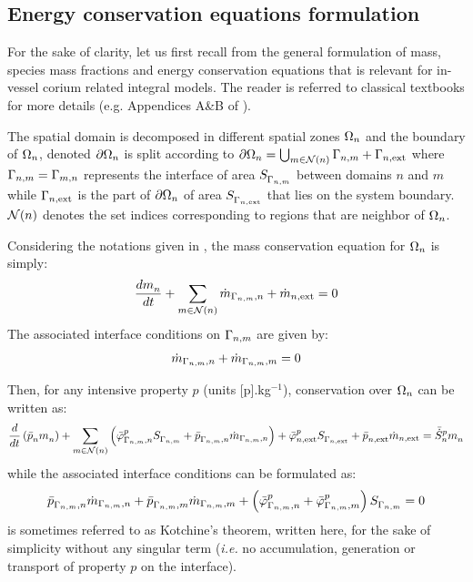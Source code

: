 
\subsection{Energy conservation equations formulation} \label{sect:cons_eq}

For the sake of clarity, let us first recall from the general formulation of mass, species mass fractions and energy conservation equations that is relevant for in-vessel corium related integral models. The reader is referred to classical textbooks for more details (e.g. Appendices A\&B of \cite{Kaviany2011}).

The spatial domain is decomposed in different spatial zones $\Omega_{n}$ and the boundary of $\Omega_{n}$, denoted $\partial \Omega_{n}$ is split according to $\partial \Omega_{n} = \bigcup_{m \in {\mathcal N}(n)} \Gamma_{n,m} + \Gamma_{n,\textrm{ext}}$ where $\Gamma_{n,m}=\Gamma_{m,n}$ represents the interface of area $\area{\interface{n,m}}$ between domains $n$ and $m$ while $\Gamma_{n,\textrm{ext}}$ is the part of $\partial \Omega_{n}$ of area $\area{\interface{n,\textrm{ext}}}$ that lies on the system boundary. ${\mathcal N}(n)$ denotes the set indices corresponding to regions that are neighbor of $\Omega_{n}$.

Considering the notations given in , the mass conservation equation for $\Omega_{n}$  is simply: 
\begin{equation} 
 \frac{d\mass{n}}{dt}  + \sum_{m \in  \Mc{N}(n)} \dot{m}_{\interface{n,m},n} + \dot{m}_{n, \textrm{ext}} = 0 \label{eq:mce_m}
\end{equation}
The associated interface conditions on $\Gamma_{n,m}$ are given by:
\begin{equation}
 \dot{m}_{\Gamma_{n,m},n}+\dot{m}_{\Gamma_{n,m},m} = 0 \label{eq:ie_m}
\end{equation}

Then, for any intensive property $p$ (units [p].kg$^{-1}$), conservation over $\Omega_{n}$ can be written as:
 \begin{equation}
  \frac{d}{dt} \left( \avProperty{n} \mass{n} \right) + \sum_{m \in  \Mc{N}(n)} \left(\avFlux[p]{\interface{n,m},n} \area{\interface{n,m}} + \avProperty{\interface{n,m},n} \dot{m}_{\interface{n,m},n}\right) + \avFlux[p]{n, \textrm{ext}} \area{\interface{n,\textrm{ext}}} + \avProperty{n, \textrm{ext}} \dot{m}_{n, \textrm{ext}} = \avMassSource[p]{n} \mass{n} \label{eq:mce3}
\end{equation}
while the associated interface conditions can be formulated as:
\begin{equation}
 \avProperty{\interface{n,m},n} \dot{m}_{\interface{n,m},n} + \avProperty{\interface{n,m},m} \dot{m}_{\interface{n,m},m} + \left(\avFlux[p]{\interface{n,m},n} +\avFlux[p]{\interface{n,m},m}\right) \area{\interface{n,m}} = 0 \label{eq:ie2}
\end{equation}
 is sometimes referred to as Kotchine's theorem, written here, for the sake of simplicity without any singular term (\textit{i.e.} no accumulation, generation or transport of property $p$ on the interface).

